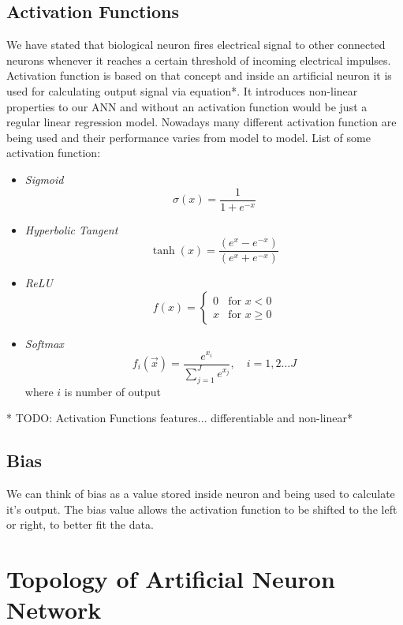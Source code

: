 \subsection{Activation Functions}

We have stated that biological neuron fires electrical signal to other connected neurons whenever it reaches a certain threshold of incoming electrical impulses.
Activation function is based on that concept and inside an artificial neuron it is used for calculating output signal via equation*.
It introduces non-linear properties to our ANN and without an activation function would be just a regular linear regression model.
Nowadays many different activation function are being used and their performance varies from model to model. \newline
\newline
List of some activation function:

\begin{itemize}
	\item \textit{Sigmoid} \[ \sigma(x)=\frac{1}{1+e^{-x}} \]
	\item \textit{Hyperbolic Tangent} \[ \tanh(x)=\frac{(e^{x} - e^{-x})}{(e^{x} + e^{-x})} \]
  \item \textit{ReLU}  \[ f(x) = \begin{cases} 0 & \text{for } x < 0 \\ x & \text{for } x \ge 0\end{cases} \]
  \item \textit{Softmax} \[ f_i(\vec{x}) = \frac{e^{x_i}}{\sum_{j=1}^J e^{x_j}}, \quad i = 1, 2 \ldots J \]
    where $i$ is number of output
\end{itemize}

* TODO: Activation Functions features... differentiable and non-linear*

\subsection{Bias}

We can think of bias as a value stored inside neuron and being used to calculate it's output.
The bias value allows the activation function to be shifted to the left or right, to better fit the data.


\section{Topology of Artificial Neuron Network}

